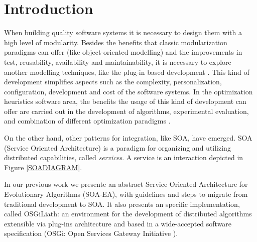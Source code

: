 \documentclass{sig-alternate}
\begin{document}


%
%
\section{Introduction}
\label{sec:intro}
%

When building quality software systems it is necessary to design them
with a high level of modularity. Besides the benefits that classic
modularization paradigms can offer (like object-oriented modelling)
and the improvements in test, reusability, availability and
maintainability, it is necessary to explore another modelling techniques, like the
plug-in based development \cite{PLUGINS}. This kind of development
simplifies aspects such as the complexity, personalization, configuration,
development and cost of the software systems. In the optimization
heuristics software area, the benefits the usage of this kind of
development can offer are carried out in the development of algorithms,
experimental evaluation, and combination of different optimization
paradigms \cite{PLUGINS}.  

On the other hand, other patterns for integration, like SOA, have emerged. SOA (Service Oriented Architecture) \cite{PAPAZOGLOU} is a paradigm for
organizing and utilizing distributed capabilities, called {\em services}. A service is an interaction depicted in Figure \ref{SOADIAGRAM}.

In our previous work \cite{OSGILIATH} we presente an abstract Service Oriented Architecture for Evolutionary Algorithms (SOA-EA), with guidelines and steps to migrate from traditional development to SOA. It also presents an specific implementation, called OSGiLiath: an environment for the development of distributed algorithms extensible via plug-ins architecture and based in a wide-accepted software specification (OSGi: Open Services Gateway Initiative \cite{OSGI}).

\end{document}
